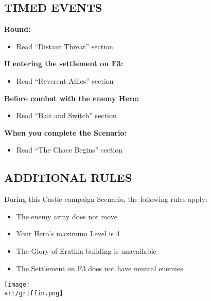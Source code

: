 \newpage

\begin{multicols}{2}

\subsection*{\MakeUppercase{Timed Events}}

\textbf{ Round:}
\begin{itemize}
  \item Read ``Distant Threat'' section
\end{itemize}

\textbf{If entering the settlement on F3:}
\begin{itemize}
  \item Read ``Reverent Allies'' section
\end{itemize}

\textbf{Before combat with the enemy Hero:}
\begin{itemize}
  \item Read ``Bait and Switch'' section
\end{itemize}

\textbf{When you complete the Scenario:}
\begin{itemize}
  \item Read ``The Chase Begins'' section
\end{itemize}

\subsection*{\MakeUppercase{Additional rules}}

During this Castle campaign Scenario, the following rules apply:

\begin{itemize}
  \item The enemy army does not move
  \item Your Hero's maximum Level is 4
  \item The Glory of Erathia building is unavailable
  \item The Settlement on F3 does not have neutral enemies
\end{itemize}

\columnbreak

\texttt{[image: \\art/griffin.png]}

\end{multicols}


